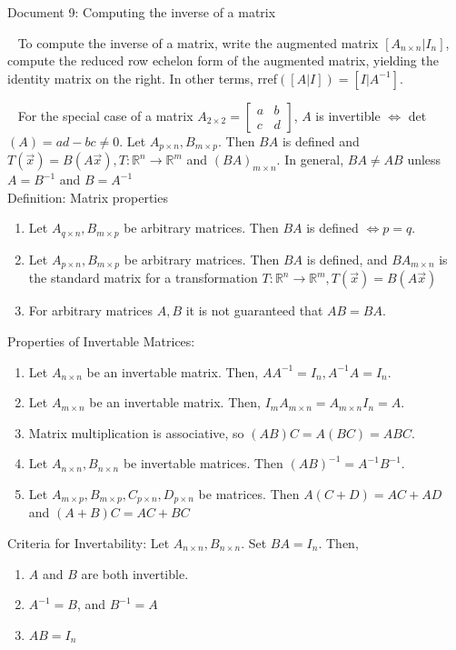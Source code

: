 \documentclass[11pt]{article}
\begin{document}
\begin{center}
Document 9: Computing the inverse of a matrix
\end{center}

\setlength{\leftskip}{0in}
$\,\,\,$ To compute the inverse of a matrix, write the augmented matrix $[A_{n\times n}|I_n]$, compute the reduced row echelon form of the augmented matrix, yielding the identity matrix on the right. In other terms, rref$([A|I])=[I|A^{-1}]$.

$\,\,\,$ For the special case of a matrix $A_{2\times 2}=\begin{bmatrix}a & b\\c & d\end{bmatrix}$, $A$ is invertible $\Leftrightarrow$ det$(A)=ad-bc\not =0$. Let $A_{p\times n},B_{m\times p}$. Then $BA$ is defined and $T(\vec{x})=B(A\vec{x}),T:\mathbb{R}^n\rightarrow\mathbb{R}^m$ and $(BA)_{m\times n}$. In general, $BA\not =AB$ unless $A=B^{-1}$ and $B=A^{-1}$\\

Definition: Matrix properties
\begin{enumerate}
\item Let $A_{q\times n},B_{m\times p}$ be arbitrary matrices. Then $BA$ is defined $\Leftrightarrow p=q$.
\item Let $A_{p\times n},B_{m\times p}$ be arbitrary matrices. Then $BA$ is defined, and $BA_{m\times n}$ is the standard matrix for a transformation $T:\mathbb{R}^n\rightarrow\mathbb{R}^m,T(\vec{x})=B(A\vec{x})$
\item For arbitrary matrices $A,B$ it is not guaranteed that $AB=BA$.\\
\end{enumerate}

Properties of Invertable Matrices:
\begin{enumerate}
\item Let $A_{n\times n}$ be an invertable matrix. Then, $AA^{-1}=I_n,A^{-1}A=I_n$.
\item Let $A_{m\times n}$ be an invertable matrix. Then, $I_mA_{m\times n}=A_{m\times n}I_n=A$.
\item Matrix multiplication is associative, so $(AB)C=A(BC)=ABC$.
\item Let $A_{n\times n},B_{n\times n}$ be invertable matrices. Then $(AB)^{-1}=A^{-1}B^{-1}$.
\item Let $A_{m\times p},B_{m\times p},C_{p\times n},D_{p\times n}$ be matrices. Then $A(C+D)=AC+AD$ and $(A+B)C=AC+BC$\\
\end{enumerate}

Criteria for Invertability: Let $A_{n\times n},B_{n\times n}$. Set $BA=I_n$. Then,
\begin{enumerate}
\item $A$ and $B$ are both invertible.
\item $A^{-1}=B$, and $B^{-1}=A$
\item $AB=I_n$
\end{enumerate}
\end{document}
